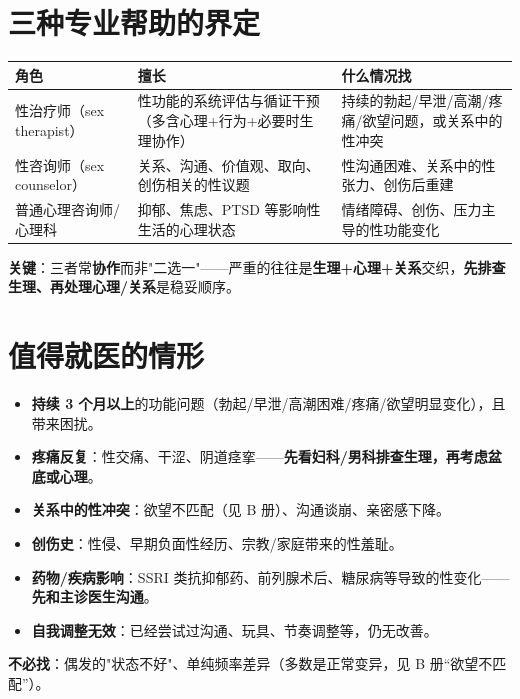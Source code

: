 \documentclass[12pt,UTF8,openany]{ctexbook}
\begin{document}
\section{三种专业帮助的界定}
\begin{tabularx}{\textwidth}{X X X}
\toprule
\textbf{角色} & \textbf{擅长} & \textbf{什么情况找} \\
\midrule
性治疗师（sex therapist） & 性功能的系统评估与循证干预（多含心理+行为+必要时生理协作） & 持续的勃起/早泄/高潮/疼痛/欲望问题，或关系中的性冲突 \\
性咨询师（sex counselor） & 关系、沟通、价值观、取向、创伤相关的性议题 & 性沟通困难、关系中的性张力、创伤后重建 \\
普通心理咨询师/心理科 & 抑郁、焦虑、PTSD 等影响性生活的心理状态 & 情绪障碍、创伤、压力主导的性功能变化 \\
\bottomrule
\end{tabularx}
\par\smallskip
\textbf{关键}：三者常\textbf{协作}而非"二选一"——严重的往往是\textbf{生理+心理+关系}交织，\textbf{先排查生理、再处理心理/关系}是稳妥顺序。

\section{值得就医的情形}
\begin{itemize}[leftmargin=2em,itemsep=0.3em]
  \item \textbf{持续 3 个月以上}的功能问题（勃起/早泄/高潮困难/疼痛/欲望明显变化），且带来困扰。
  \item \textbf{疼痛反复}：性交痛、干涩、阴道痉挛——\textbf{先看妇科/男科排查生理，再考虑盆底或心理}。
  \item \textbf{关系中的性冲突}：欲望不匹配（见 B 册）、沟通谈崩、亲密感下降。
  \item \textbf{创伤史}：性侵、早期负面性经历、宗教/家庭带来的性羞耻。
  \item \textbf{药物/疾病影响}：SSRI 类抗抑郁药、前列腺术后、糖尿病等导致的性变化——\textbf{先和主诊医生沟通}。
  \item \textbf{自我调整无效}：已经尝试过沟通、玩具、节奏调整等，仍无改善。
\end{itemize}
\textbf{不必找}：偶发的"状态不好"、单纯频率差异（多数是正常变异，见 B 册“欲望不匹配”）。
\end{document}
